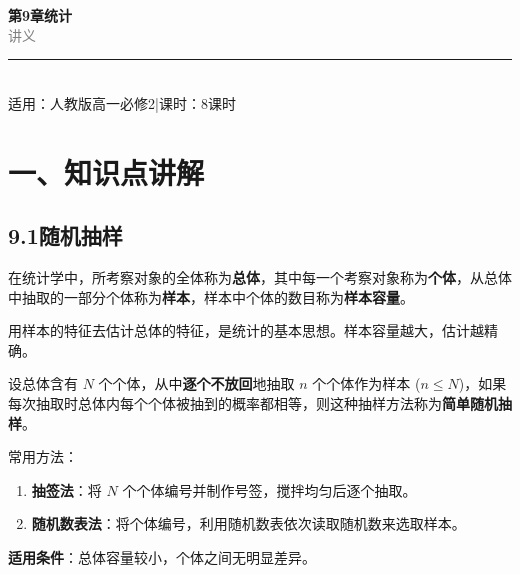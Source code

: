 \documentclass[12pt, a4paper]{ctexart}
\begin{document}
\begin{center}
{\Huge\bfseries\textcolor{mainblue}{第9章\quad 统\quad 计}}\\[12pt]
{\Large\textcolor{gray}{讲\quad 义}}\\[8pt]
\rule{0.6\textwidth}{1pt}\\[8pt]
{\normalsize 适用：人教版\quad 高一必修2\quad |\quad 课时：8课时}
\end{center}
\vspace{10pt}

\section*{\textcolor{mainblue}{一、知识点讲解}}

\subsection*{9.1\quad 随机抽样}

\begin{knowledgebox}[总体、个体、样本与样本容量]
在统计学中，所考察对象的全体称为\textbf{总体}，其中每一个考察对象称为\textbf{个体}，从总体中抽取的一部分个体称为\textbf{样本}，样本中个体的数目称为\textbf{样本容量}。

用样本的特征去估计总体的特征，是统计的基本思想。样本容量越大，估计越精确。
\end{knowledgebox}

\begin{knowledgebox}[简单随机抽样]
设总体含有 $N$ 个个体，从中\textbf{逐个不放回}地抽取 $n$ 个个体作为样本 ($n \leqslant N$)，如果每次抽取时总体内每个个体被抽到的概率都相等，则这种抽样方法称为\textbf{简单随机抽样}。

常用方法：
\begin{enumerate}[label=(\arabic*)]
  \item \textbf{抽签法}：将 $N$ 个个体编号并制作号签，搅拌均匀后逐个抽取。
  \item \textbf{随机数表法}：将个体编号，利用随机数表依次读取随机数来选取样本。
\end{enumerate}

\textbf{适用条件}：总体容量较小，个体之间无明显差异。
\end{knowledgebox}
\end{document}
